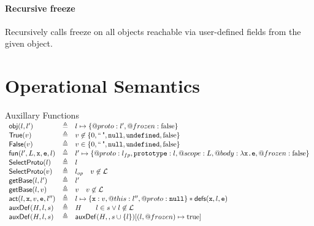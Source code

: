\documentclass[a4paper]{article}
\begin{document}
\paragraph{Recursive freeze} Recursively calls freeze on all objects reachable
via user-defined fields from the given object.

\section{Operational Semantics}
\newcommand{\auxf}[2]{#1 & \triangleq & #2}
\begin{display}{Auxillary Functions}
  $\begin{array}{lcl}
  \auxf{\obj(l,l')}{l \pointsto \{@proto: l', @frozen: \false\}}\\
  \auxf{\istrue(v)}{v\not\in\{0,\emptystr,\nil,\und,\false\}}\\
  \auxf{\isfalse(v)}{v\in   \{0,\emptystr,\nil,\und,\false\}}\\
  \auxf{\fun(l',L,\js x,\js e,l)}{l'\mapsto\{@proto: \lfp, \js{prototype}:
    l, @scope: L, @body: \lambda \js{x.e}, @frozen: \false\}}\\
  \auxf{\objOrGlob(l)}{l}\\
  \auxf{\objOrGlob(v)}{\lop \quad v\not\in\loc}\\
  \auxf{\getBase(l,l')}{l'}\\
  \auxf{\getBase(l,v)}{v \quad v\not\in\loc}\\
  \auxf{\act(l,\js{x},v,\js{e},l'')}{l\pointsto\{\js{x}:
    v,@this: l'',@proto: \nil\}\sep \defs(\js{x},l,\js{e})}\\
  \auxf{\auxDef(H,l,s)}{H \qquad l \in s \lor l \not\in \loc}\\
  \auxf{\auxDef(H,l,s)}{\auxDef(H,,s \cup\{l\})[(l,@frozen) \mapsto \true]}
  \end{array}$
\end{display}
\end{document}
